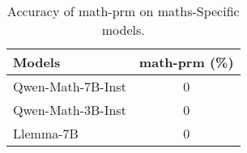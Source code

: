 \begin{table}[h!]
    \centering
    \renewcommand{\arraystretch}{1.3} %
    \begin{tabular}{|l| c|}
        \hline
        \textbf{Models} & \textbf{math-prm (\%)} \\
        \hline
        Qwen-Math-7B-Inst & 0 \\ \hline
        Qwen-Math-3B-Inst & 0 \\ \hline
        Llemma-7B & 0 \\ 
        \hline
    \end{tabular}
    \caption{Accuracy of math-prm on maths-Specific models.}
    \label{tab:model_accuracy}
\end{table}